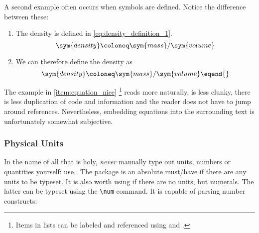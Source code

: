 A second example often occurs when symbols are defined.
Notice the difference between these:
\begin{enumerate}
    \item The density  is defined in \cref{eq:density_definition_1}.
          \begin{equation}\label{eq:density_definition_1}
              \sym{density} \coloneq \sym{mass} / \sym{volume}
          \end{equation}
    \item \label{item:equation_nice} We can therefore define the density as
          \begin{equation}
              \sym{density} \coloneq \sym{mass} / \sym{volume} \eqend{}
          \end{equation}
\end{enumerate}
The example in \cref{item:equation_nice}%
\footnote{%
    Items in lists can be labeled and referenced using  and
    .%
}
reads more naturally, is less clunky, there is less duplication of code and
information and the reader does not have to jump around references.
Nevertheless, embedding equations into the surrounding text is unfortunately
somewhat subjective.

\subsubsection{Physical Units}

In the name of all that is holy, \emph{never} manually type out units, numbers
or quantities yourself: use .
The package is an absolute must\-/have if there are any units to be typeset.
It is also worth using if there are no units, but numerals.
The latter can be typeset using the \verb|\num| command.
It is capable of parsing number constructs:

